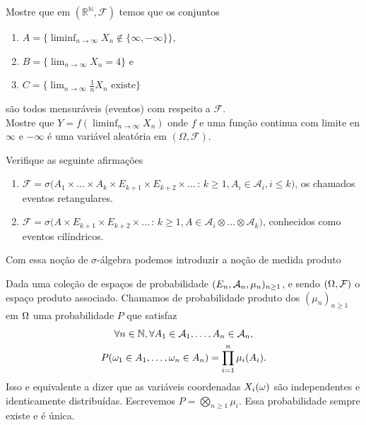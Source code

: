 \begin{topics}
\begin{exercise}
  Mostre que em $(\mathbb{R}^{\mathbb{N}},\mathcal{F})$ temos que os conjuntos
  \begin{enumerate}[\quad a)]
  \item $A = \{ \liminf_{n\to \infty} X_n \notin \{\infty,-\infty\} \}$,
  \item $B = \{ \lim_{n\to \infty} X_n = 4\}$ e
  \item $C = \{ \lim_{n\to \infty} \tfrac{1}{n} X_n \text{ existe}\}$
  \end{enumerate}
  são todos mensuráveis (eventos) com respeito a $\mathcal{F}$.\\
  \noindent Mostre que $Y = f(\liminf_{n\to \infty} X_n)$ onde $f$ e uma função continua com limite en $\infty$ e $-\infty$ é uma variável aleatória em $(\Omega, \mathcal{F})$.
\end{exercise}

\begin{exercise}
  Verifique as seguinte afirmações
  \begin{enumerate}[\quad a)]
  \item $\mathcal{F} = \sigma\big(A_1 \times \dots \times A_k \times E_{k+1} \times E_{k+2} \times \dots\, : \, k \geq 1, A_i \in \mathcal{A}_i, i \leq k\big)$,
  os chamados eventos retangulares.
  \item $\mathcal{F} = \sigma\big(A \times E_{k+1} \times E_{k+2} \times \dots\, : \, k \geq 1, A \in \mathcal{A}_i \otimes \dots \otimes \mathcal{A}_k\big)$,
  conhecidos como eventos cilíndricos.
  \end{enumerate}
\end{exercise}



Com essa noção de $\sigma$-álgebra podemos introduzir a noção de medida produto
\begin{definition}
Dada uma coleção de espaços de probabilidade $(E_n,{\mathcal A}_n,\mu_n)_{n\ge 1}$, e
sendo $(\Omega,{\mathcal F})$ o espaço produto associado. Chamamos de probabilidade produto dos $(\mu_n)_{n\ge 1}$ em $\Omega$ uma probabilidade $P$ que satisfaz
\begin{multline}
\forall n\in {\ensuremath{\mathbb N}}, \forall A_1\in {\ensuremath{\mathcal A}}_1,\dots, A_n\in {\ensuremath{\mathcal A}}_n, \\ P(\omega_1\in A_1,\dots ,\omega_n\in A_n)=\prod_{i=1}^n \mu_i(A_i).
\end{multline}
Isso e equivalente a dizer que as variáveis coordenadas $X_i(\omega)$ são independentes e identicamente distribuídas.
Escrevemos $P=\bigotimes_{n\ge 1} \mu_i$.
Essa probabilidade sempre existe e é única.
\end{definition}


\end{topics}

